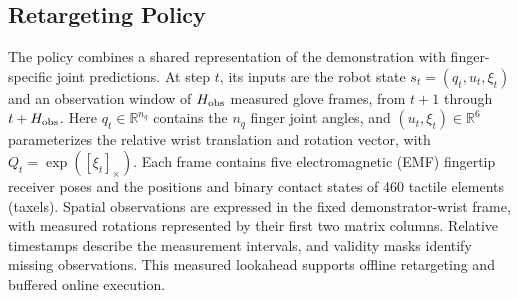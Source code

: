 \subsection{Retargeting Policy}
\label{sec:cart-architecture}

The policy combines a shared representation of the demonstration with finger-specific joint predictions. At step $t$, its inputs are the robot state $s_t=(q_t,u_t,\xi_t)$ and an observation window of $H_{\rm obs}$ measured glove frames, from $t+1$ through $t+H_{\rm obs}$. Here $q_t\in\mathbb R^{n_q}$ contains the $n_q$ finger joint angles, and $(u_t,\xi_t)\in\mathbb R^6$ parameterizes the relative wrist translation and rotation vector, with $Q_t=\exp([\xi_t]_\times)$. Each frame contains five electromagnetic (EMF) fingertip receiver poses and the positions and binary contact states of 460 tactile elements (taxels). Spatial observations are expressed in the fixed demonstrator-wrist frame, with measured rotations represented by their first two matrix columns. Relative timestamps describe the measurement intervals, and validity masks identify missing observations. This measured lookahead supports offline retargeting and buffered online execution.

